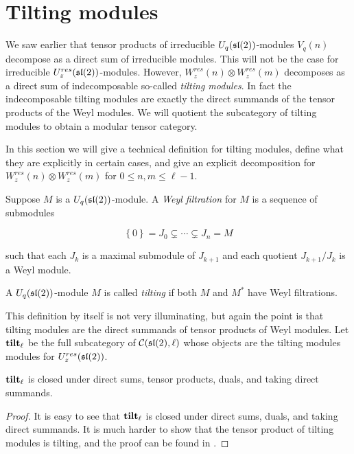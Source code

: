 \section{Tilting modules} 
\label{section:Tilting}

We saw earlier that tensor products of irreducible $U_q(\mathfrak{sl}(2))$-modules
$V_q(n)$ decompose as a direct sum of irreducible modules. This will not be the
case for irreducible $U_z^{res}(\mathfrak{sl}(2))$-modules. However,
$W_z^{res}(n)\otimes W_z^{res}(m)$ decomposes as a direct sum of indecomposable
so-called \emph{tilting modules}. In fact the indecomposable tilting modules are exactly
the direct summands of the tensor products of the Weyl modules. We will
quotient the subcategory of tilting modules to obtain a modular tensor
category. 

In this section we will give a technical definition for tilting modules, define
what they are explicitly in certain cases, and give an explicit decomposition
for $W^{res}_z(n) \otimes W_z^{res}(m)$ for $0 \leq n,m \leq \ell - 1$.

\begin{defn}
    Suppose $M$ is a $U_q(\mathfrak{sl}(2))$-module. A \emph{Weyl filtration} for $M$
    is a sequence of submodules 

    \begin{equation}
        \left\{ 0 \right\} = J_0 \subsetneq \cdots \subsetneq J_n = M
    \end{equation}

    such that each $J_k$ is a maximal submodule of $J_{k+1}$ and each quotient $J_{k+1}/J_k$ is a Weyl module. 
\end{defn}

\begin{defn}
    A $U_q(\mathfrak{sl}(2))$-module $M$ is called \emph{tilting} if both $M$ and $M^*$ have Weyl filtrations.
\end{defn}

This definition by itself is not very illuminating, but again the point is that
tilting modules are the direct summands of tensor products of Weyl modules.
Let $\mathbf{tilt}_\ell$ be the full subcategory of $\mathcal{C}(\mathfrak{sl}(2), \ell)$ whose
objects are the tilting modules modules for $U_z^{res}(\mathfrak{sl}(2))$.  

\begin{prop}
    $\mathbf{tilt}_\ell$ is closed under direct sums, tensor products, duals, and taking direct summands.
\end{prop}
\begin{proof}
    It is easy to see that $\mathbf{tilt}_\ell$ is closed under direct sums, duals, and
    taking direct summands. It is much harder to show that the tensor product
    of tilting modules is tilting, and the proof can be found in \cite{Andersen1992}.
\end{proof}

